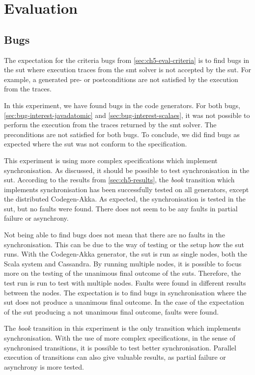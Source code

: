 \section{Evaluation}\label{sec:ch5-evaluation}

\subsection{Bugs}
The expectation for the criteria bugs from \autoref{sec:ch5-eval-criteria} is to
find bugs in the \gls{sut} where execution traces from the \gls{smt} solver
is not accepted by the \gls{sut}. For example, a generated pre- or postconditions
are not satisfied by the execution from the traces.

In this experiment, we have found bugs in the code generators. For both bugs,
\autoref{sec:bug-interest-javadatomic} and \autoref{sec:bug-interest-scalaes},
it was not possible to perform the execution from the traces returned by the
\gls{smt} solver. The preconditions are not satisfied for both bugs. To conclude,
we did find bugs as expected where the \gls{sut} was not conform to the
specification.

This experiment is using more complex specifications which implement
synchronisation. As discussed, it should be possible to test synchronisation in
the \gls{sut}. According to the results from \autoref{sec:ch5-results}, the
\textit{book} transition which implements synchronisation has been successfully
tested on all generators, except the distributed Codegen-Akka. As expected, the
synchronisation is tested in the \gls{sut}, but no faults were found. There does
not seem to be any faults in partial failure or asynchrony.

Not being able to find bugs does not mean that there are no faults in the
synchronisation. This can be due to the way of testing or the setup how the
\gls{sut} runs. With the Codegen-Akka generator, the \gls{sut} is run as single
nodes, both the Scala system and Cassandra. By running multiple nodes, it is
possible to focus more on the testing of the unanimous final outcome of the
\gls{sut}s.
Therefore, the test run \label{sec:bug-dist-nodes} is run to test with multiple
nodes. Faults were found in different results between the nodes.
The expectation is to find bugs in synchronisation where the \gls{sut} does not
produce a unanimous final outcome. In the case of the expectation of the
\gls{sut} producing a not unanimous final outcome, faults were found.

The \textit{book} transition in this experiment is the only transition which
implements synchronisation. With the use of more complex specifications, in the
sense of synchronised transitions, it is possible to test better
synchronisation. Parallel execution of transitions can also give valuable
results, as partial failure or asynchrony is more tested.

